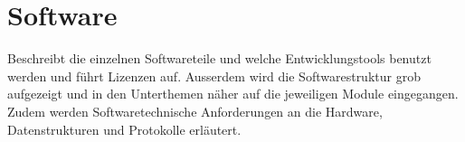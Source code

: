 \section{Software}\label{sec:software}

Beschreibt die einzelnen Softwareteile und welche Entwicklungstools benutzt werden und führt Lizenzen auf. Ausserdem wird die Softwarestruktur grob aufgezeigt und in den Unterthemen näher auf die jeweiligen Module eingegangen. Zudem werden Softwaretechnische Anforderungen an die Hardware, Datenstrukturen und Protokolle erläutert.